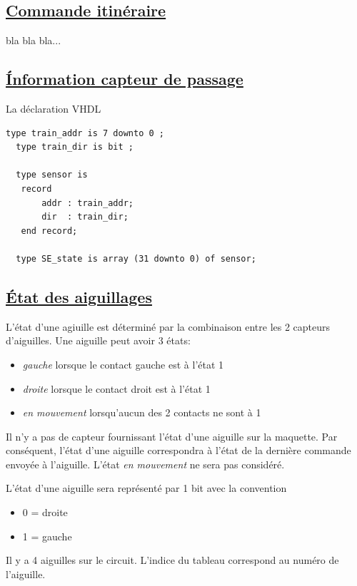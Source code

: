 \subsection{\underline{Commande itinéraire}}
\label{sec:ixl_iti}

bla bla bla...

\subsection{\underline{\'Information capteur de passage}}
\label{sec:ixl_cdv}


\medskip
La déclaration VHDL
\begin{lstlisting}[style=vhdl]
  type train_addr is 7 downto 0 ;
  type train_dir is bit ;

  type sensor is
   record
       addr : train_addr;
       dir  : train_dir;
   end record;

  type SE_state is array (31 downto 0) of sensor;
\end{lstlisting}


\subsection{\underline{\'Etat des aiguillages}}
\label{sec:ixl_aig}

L'état d'une agiuille est déterminé par la combinaison entre les 2
capteurs d'aiguilles.  Une aiguille peut avoir 3 états:
\begin{itemize}
\item \emph{gauche} lorsque le contact gauche est à l'état 1
\item \emph{droite} lorsque le contact droit est à l'état 1
\item \emph{en mouvement} lorsqu'aucun des 2 contacts ne sont à 1
\end{itemize}

Il n'y a pas de capteur fournissant l'état d'une aiguille sur la
maquette.  Par conséquent, l'état d'une aiguille correspondra à l'état
de la dernière commande envoyée à l'aiguille. L'état \emph{en
  mouvement} ne sera pas considéré.
 
L'état d'une aiguille sera représenté par 1 bit avec la convention
\begin{itemize}
\item 0 = droite
\item 1 = gauche
\end{itemize}
 
Il y a 4 aiguilles sur le circuit. L'indice du tableau correspond au
numéro de l'aiguille.

